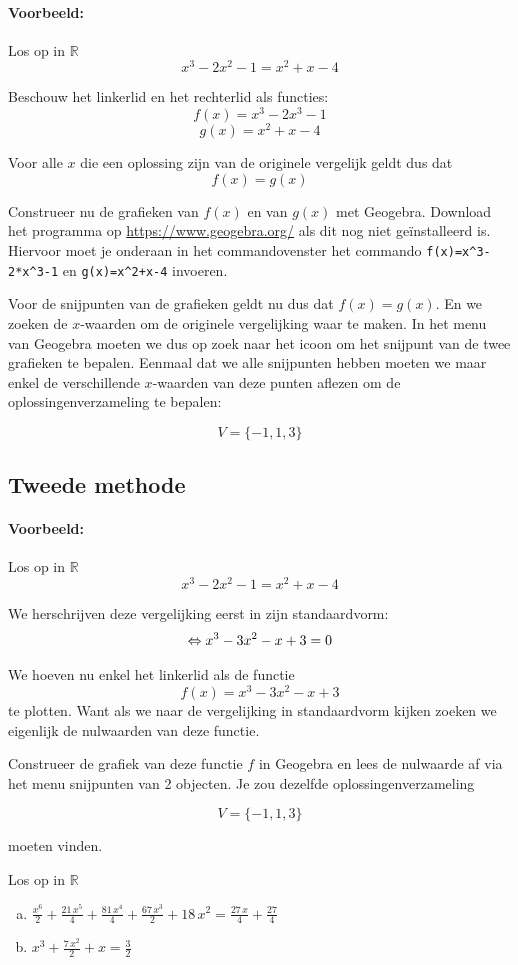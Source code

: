 \documentclass[12pt,twoside,a4paper]{article}
\begin{document}
\paragraph*{Voorbeeld:} Los op in $\mathbb{R}$
$$x^3-2x^2-1=x^2+x-4$$

Beschouw het linkerlid en het rechterlid als functies:
$$f(x)=x^3-2x^3-1$$
$$g(x)=x^2+x-4$$

Voor alle $x$ die een oplossing zijn van de originele vergelijk geldt dus dat
$$f(x)=g(x)$$

Construeer nu de grafieken van $f(x)$ en van $g(x)$ met Geogebra. Download het programma op \url{https://www.geogebra.org/} als dit nog niet geïnstalleerd is. Hiervoor moet je onderaan in het commandovenster het commando \verb#f(x)=x^3-2*x^3-1# en \verb#g(x)=x^2+x-4# invoeren.

Voor de snijpunten van de grafieken geldt nu dus dat $f(x)=g(x)$. En we zoeken de $x$-waarden om de originele vergelijking waar te maken. In het menu van Geogebra moeten we dus op zoek naar het icoon om het snijpunt van de twee grafieken te bepalen. Eenmaal dat we alle snijpunten hebben moeten we maar enkel de verschillende $x$-waarden van deze punten aflezen om de oplossingenverzameling te bepalen:

$$V=\{-1, 1, 3\}$$

\subsection*{Tweede methode}

\paragraph*{Voorbeeld:} Los op in $\mathbb{R}$
$$x^3-2x^2-1=x^2+x-4$$

We herschrijven deze vergelijking eerst in zijn standaardvorm:
$$\Leftrightarrow x^3-3x^2-x + 3=0$$

We hoeven nu enkel het linkerlid als de functie
$$f(x)=x^3-3x^2-x + 3$$
te plotten. Want als we naar de vergelijking in standaardvorm kijken zoeken we eigenlijk de nulwaarden van deze functie.

Construeer de grafiek van deze functie $f$ in Geogebra en lees de nulwaarde af via het menu snijpunten van 2 objecten. Je zou dezelfde oplossingenverzameling

$$V=\{-1, 1, 3\}$$

moeten vinden.

\begin{oefening}
  Los op in $\mathbb{R}$\\
  \begin{enumerate}[(a)]
    \itemsep.8em
  \item $\displaystyle \frac{{x}^{6}}{2}+\frac{21\,{x}^{5}}{4}+\frac{81\,{x}^{4}}{4}+\frac{67\,{x}^{3}}{2}+18\,{x}^{2} = \frac{27\,x}{4}+\frac{27}{4}$
  \item $\displaystyle{x}^{3}+\frac{7\,{x}^{2}}{2}+x=\frac{3}{2}$
  \end{enumerate}
\end{oefening}
\end{document}
